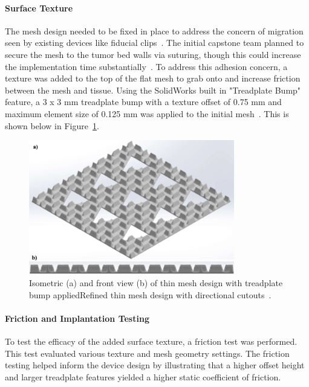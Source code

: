 \paragraph*{Surface Texture\label{introduction:priorWork:otherTeamWork:deviceDesign:surfaceTexture}}

The mesh design needed to be fixed in place to address the concern of migration seen by existing devices like fiducial clips~\cite{RefWorks:RefID:344-mitchell2019adaptable}. The initial capstone team planned to secure the mesh to the tumor bed walls via suturing, though this could increase the implementation time substantially~\cite{RefWorks:RefID:372-krakovskytumor}. To address this adhesion concern, a texture was added to the top of the flat mesh to grab onto and increase friction between the mesh and tissue. Using the SolidWorks built in "Treadplate Bump" feature, a 3 x 3 mm treadplate bump with a texture offset of 0.75 mm and maximum element size of 0.125 mm was applied to the initial mesh~\cite{RefWorks:RefID:371-bakhtardesign}. This is shown below in Figure~\ref{fig:introduction:meshWithTreadplate}.

\begin{figure}[h!]
        \centering
        \includegraphics[width=0.8\textwidth]{../figs/introduction/mesh_design_with_treadplate.png}
        \caption{Isometric (a) and front view (b) of thin mesh design with treadplate bump appliedRefined thin mesh design with directional cutouts~\cite{RefWorks:RefID:371-bakhtardesign}.}
        \label{fig:introduction:meshWithTreadplate}
\end{figure}

\paragraph*{Friction and Implantation Testing\label{introduction:priorWork:otherTeamWork:deviceDesign:frictionTesting}}
To test the efficacy of the added surface texture, a friction test was performed. This test evaluated various texture and mesh geometry settings. The friction testing helped inform the device design by illustrating that a higher offset height and larger treadplate features yielded a higher static coefficient of friction.

